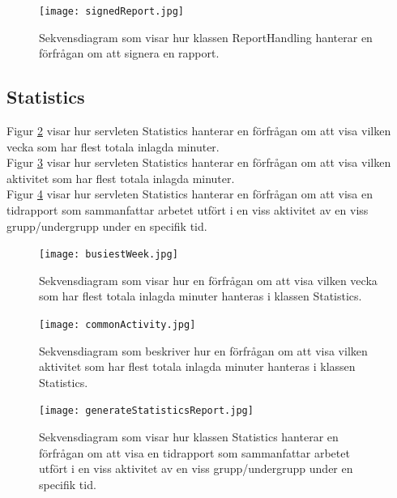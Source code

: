 \documentclass[a4paper]{article}
\begin{document}
\begin{figure}[h!]
\centering
\texttt{[image: signedReport.jpg]}
\caption{Sekvensdiagram som visar hur klassen ReportHandling hanterar en förfrågan om att signera en rapport.
\label{signedReport}}
\end{figure}

\subsection{Statistics}
Figur \ref{busiestWeek} visar hur servleten Statistics hanterar en förfrågan om att visa vilken vecka som har flest totala inlagda minuter.\\
Figur \ref{commonActivity} visar hur servleten Statistics hanterar en förfrågan om att visa vilken aktivitet som har flest totala inlagda minuter.\\
Figur \ref{generateStatisticsReport} visar hur servleten Statistics hanterar en förfrågan om att visa en tidrapport som sammanfattar arbetet utfört i en viss aktivitet av en viss grupp/undergrupp under en specifik tid.

\begin{figure}[h!]
\centering
\texttt{[image: busiestWeek.jpg]}
\caption{Sekvensdiagram som visar hur en förfrågan om att visa vilken vecka som har flest totala inlagda minuter hanteras i klassen Statistics.
\label{busiestWeek}}
\end{figure}

\begin{figure}[h!]
\centering
\texttt{[image: commonActivity.jpg]}
\caption{Sekvensdiagram som beskriver hur en förfrågan om att visa vilken aktivitet som har flest totala inlagda minuter hanteras i klassen Statistics.
\label{commonActivity}}
\end{figure}

\begin{figure}[h!]
\centering
\texttt{[image: generateStatisticsReport.jpg]}
\caption{Sekvensdiagram som visar hur klassen Statistics hanterar en förfrågan om att visa en tidrapport som sammanfattar arbetet utfört i en viss aktivitet av en viss grupp/undergrupp under en specifik tid.
\label{generateStatisticsReport}}
\end{figure}
\end{document}
